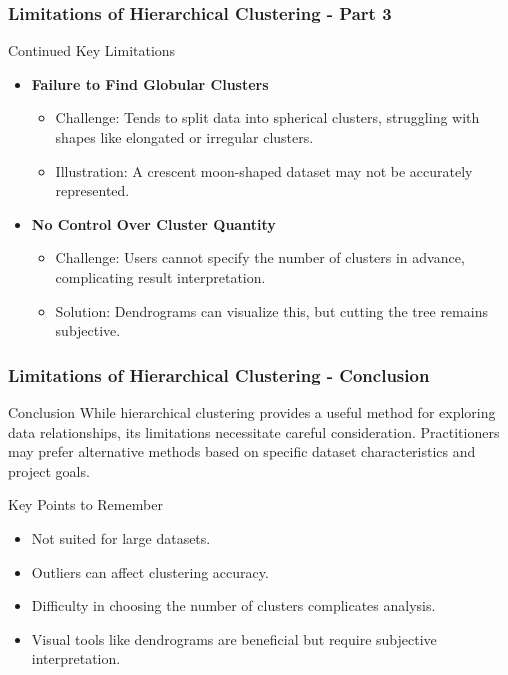 \documentclass[aspectratio=169]{beamer}
\begin{document}
\begin{frame}[fragile]
    \frametitle{Limitations of Hierarchical Clustering - Part 3}
    \begin{block}{Continued Key Limitations}
        \begin{itemize}
            \item \textbf{Failure to Find Globular Clusters}
                \begin{itemize}
                    \item Challenge: Tends to split data into spherical clusters, struggling with shapes like elongated or irregular clusters.
                    \item Illustration: A crescent moon-shaped dataset may not be accurately represented.
                \end{itemize}

            \item \textbf{No Control Over Cluster Quantity}
                \begin{itemize}
                    \item Challenge: Users cannot specify the number of clusters in advance, complicating result interpretation.
                    \item Solution: Dendrograms can visualize this, but cutting the tree remains subjective.
                \end{itemize}
        \end{itemize}
    \end{block}
\end{frame}

\begin{frame}[fragile]
    \frametitle{Limitations of Hierarchical Clustering - Conclusion}
    \begin{block}{Conclusion}
        While hierarchical clustering provides a useful method for exploring data relationships, its limitations necessitate careful consideration. Practitioners may prefer alternative methods based on specific dataset characteristics and project goals.
    \end{block}

    \begin{block}{Key Points to Remember}
        \begin{itemize}
            \item Not suited for large datasets.
            \item Outliers can affect clustering accuracy.
            \item Difficulty in choosing the number of clusters complicates analysis.
            \item Visual tools like dendrograms are beneficial but require subjective interpretation.
        \end{itemize}
    \end{block}
\end{frame}
\end{document}
